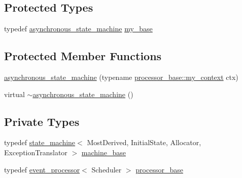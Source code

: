\subsection*{Protected Types}
\begin{DoxyCompactItemize}
\item 
typedef \mbox{\hyperlink{classboost_1_1statechart_1_1asynchronous__state__machine}{asynchronous\+\_\+state\+\_\+machine}} \mbox{\hyperlink{classboost_1_1statechart_1_1asynchronous__state__machine_ad2d3eb216740758af0982c1b04e7331d}{my\+\_\+base}}
\end{DoxyCompactItemize}
\subsection*{Protected Member Functions}
\begin{DoxyCompactItemize}
\item 
\mbox{\hyperlink{classboost_1_1statechart_1_1asynchronous__state__machine_af27bb28945bb6a4d824e3a2c0a7c6968}{asynchronous\+\_\+state\+\_\+machine}} (typename \mbox{\hyperlink{classboost_1_1statechart_1_1event__processor_a99f1c6ec8419ec82f140c5c93c5eb8cd}{processor\+\_\+base\+::my\+\_\+context}} ctx)
\item 
virtual \mbox{\hyperlink{classboost_1_1statechart_1_1asynchronous__state__machine_aca67fcba8555b76db8c1d13c94f597bb}{$\sim$asynchronous\+\_\+state\+\_\+machine}} ()
\end{DoxyCompactItemize}
\subsection*{Private Types}
\begin{DoxyCompactItemize}
\item 
typedef \mbox{\hyperlink{classboost_1_1statechart_1_1state__machine}{state\+\_\+machine}}$<$ Most\+Derived, Initial\+State, Allocator, Exception\+Translator $>$ \mbox{\hyperlink{classboost_1_1statechart_1_1asynchronous__state__machine_a5fb2caf90c443b6517ecb6ce86a672d7}{machine\+\_\+base}}
\item 
typedef \mbox{\hyperlink{classboost_1_1statechart_1_1event__processor}{event\+\_\+processor}}$<$ Scheduler $>$ \mbox{\hyperlink{classboost_1_1statechart_1_1asynchronous__state__machine_a59f192af18b9070396e42994a8dbeb35}{processor\+\_\+base}}
\end{DoxyCompactItemize}
